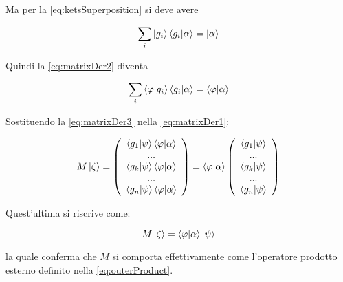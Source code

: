 Ma per la \eqref{eq:ketsSuperposition} si deve avere

	\begin{equation}
		\sum_i \ket{g_i} \braket{g_i}{\alpha} = \ket{\alpha}
	\end{equation}

Quindi la \eqref{eq:matrixDer2} diventa

	\begin{equation} \label{eq:matrixDer3}
		\sum_i \braket{\varphi}{g_i} \braket{g_i}{\alpha} = \braket{\varphi}{\alpha}
	\end{equation}

Sostituendo la \eqref{eq:matrixDer3} nella \eqref{eq:matrixDer1}:

	\begin{equation}
			M \ket{\zeta} = \left ( \begin{array}{c}
				\braket{g_1}{\psi} \braket{\varphi}{\alpha} \\
				... \\
				\braket{g_k}{\psi} \braket{\varphi}{\alpha} \\
				... \\
				\braket{g_n}{\psi} \braket{\varphi}{\alpha} \\
			\end{array}
		\right ) = \braket{\varphi}{\alpha} \left ( \begin{array}{c}
				\braket{g_1}{\psi} \\
				... \\
				\braket{g_k}{\psi} \\
				... \\
				\braket{g_n}{\psi} \\
			\end{array}
		\right )
	\end{equation}

Quest'ultima si riscrive come:

	\begin{equation}
		M \ket{\zeta} = \braket{\varphi}{\alpha} \ket{\psi}
	\end{equation}

la quale conferma che $M$ si comporta effettivamente come l'operatore prodotto esterno definito nella \eqref{eq:outerProduct}.
